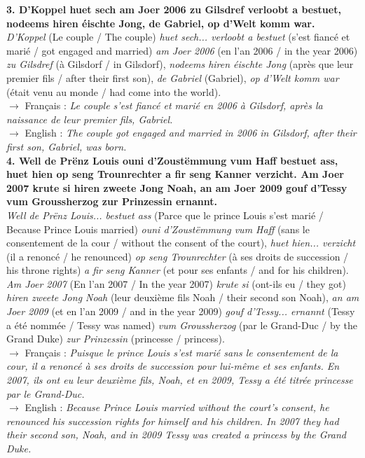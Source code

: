 \noindent\textbf{3. D'Koppel huet sech am Joer 2006 zu Gilsdref verloobt a bestuet, nodeems hiren éischte Jong, de Gabriel, op d'Welt komm war.}\\
\textit{D'Koppel} (Le couple / The couple) \textit{huet sech... verloobt a bestuet} (s'est fiancé et marié / got engaged and married) \textit{am Joer 2006} (en l'an 2006 / in the year 2006) \textit{zu Gilsdref} (à Gilsdorf / in Gilsdorf), \textit{nodeems hiren éischte Jong} (après que leur premier fils / after their first son), \textit{de Gabriel} (Gabriel), \textit{op d'Welt komm war} (était venu au monde / had come into the world).\\
$\rightarrow$ Français : \textit{Le couple s'est fiancé et marié en 2006 à Gilsdorf, après la naissance de leur premier fils, Gabriel.}\\
$\rightarrow$ English : \textit{The couple got engaged and married in 2006 in Gilsdorf, after their first son, Gabriel, was born.}\\[0.5em]

\noindent\textbf{4. Well de Prënz Louis ouni d'Zoustëmmung vum Haff bestuet ass, huet hien op seng Trounrechter a fir seng Kanner verzicht. Am Joer 2007 krute si hiren zweete Jong Noah, an am Joer 2009 gouf d'Tessy vum Groussherzog zur Prinzessin ernannt.}\\
\textit{Well de Prënz Louis... bestuet ass} (Parce que le prince Louis s'est marié / Because Prince Louis married) \textit{ouni d'Zoustëmmung vum Haff} (sans le consentement de la cour / without the consent of the court), \textit{huet hien... verzicht} (il a renoncé / he renounced) \textit{op seng Trounrechter} (à ses droits de succession / his throne rights) \textit{a fir seng Kanner} (et pour ses enfants / and for his children). \textit{Am Joer 2007} (En l'an 2007 / In the year 2007) \textit{krute si} (ont-ils eu / they got) \textit{hiren zweete Jong Noah} (leur deuxième fils Noah / their second son Noah), \textit{an am Joer 2009} (et en l'an 2009 / and in the year 2009) \textit{gouf d'Tessy... ernannt} (Tessy a été nommée / Tessy was named) \textit{vum Groussherzog} (par le Grand-Duc / by the Grand Duke) \textit{zur Prinzessin} (princesse / princess).\\
$\rightarrow$ Français : \textit{Puisque le prince Louis s'est marié sans le consentement de la cour, il a renoncé à ses droits de succession pour lui-même et ses enfants. En 2007, ils ont eu leur deuxième fils, Noah, et en 2009, Tessy a été titrée princesse par le Grand-Duc.}\\
$\rightarrow$ English : \textit{Because Prince Louis married without the court's consent, he renounced his succession rights for himself and his children. In 2007 they had their second son, Noah, and in 2009 Tessy was created a princess by the Grand Duke.}\\[0.5em]

